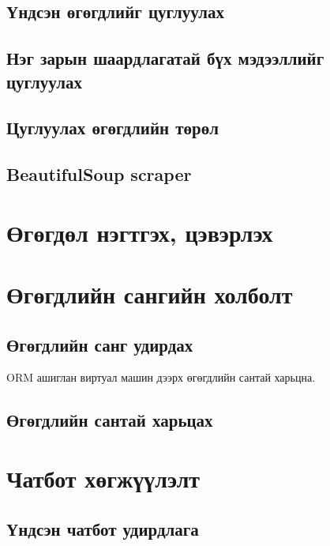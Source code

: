 \subsection{Үндсэн өгөгдлийг цуглуулах}

\subsection{Нэг зарын шаардлагатай бүх мэдээллийг цуглуулах}

\subsection{Цуглуулах өгөгдлийн төрөл}

\subsection{BeautifulSoup scraper}

\section{Өгөгдөл нэгтгэх, цэвэрлэх}


\section{Өгөгдлийн сангийн холболт}
\subsection{Өгөгдлийн санг удирдах}
ORM ашиглан виртуал машин дээрх өгөгдлийн сантай харьцна.

\subsection{Өгөгдлийн сантай харьцах}

\section{Чатбот хөгжүүлэлт}
\subsection{Үндсэн чатбот удирдлага}

